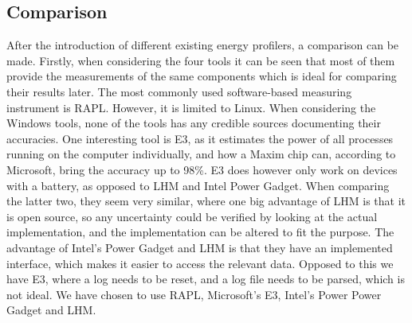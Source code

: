 \subsection{Comparison}\label{subsec:software_comparison}

After the introduction of different existing energy profilers, a comparison can be made. Firstly, when considering the four tools it can be seen that most of them provide the measurements of the same components which is ideal for comparing their results later. The most commonly used software-based measuring instrument is RAPL. However, it is limited to Linux. When considering the Windows tools, none of the tools has any credible sources documenting their accuracies. One interesting tool is E3, as it estimates the power of all processes running on the computer individually, and how a Maxim chip can, according to Microsoft, bring the accuracy up to 98\%.\cite[]{E3WinHec} E3 does however only work on devices with a battery, as opposed to LHM and Intel Power Gadget. When comparing the latter two, they seem very similar, where one big advantage of LHM is that it is open source, so any uncertainty could be verified by looking at the actual implementation, and the implementation can be altered to fit the purpose. The advantage of Intel's Power Gadget and LHM is that they have an implemented interface, which makes it easier to access the relevant data. Opposed to this we have E3, where a log needs to be reset, and a log file needs to be parsed, which is not ideal. We have chosen to use RAPL, Microsoft's E3, Intel's Power Power Gadget and LHM. 


